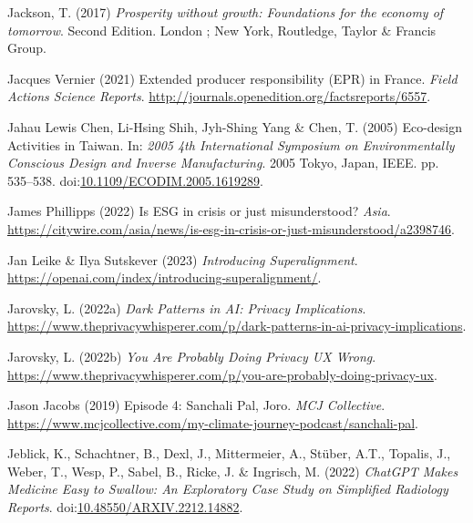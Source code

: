\documentclass[
  letterpaper,
  DIV=11,
  numbers=noendperiod]{scrartcl}
\newlength{\cslhangindent}
\newenvironment{CSLReferences}[2] %
 {\begin{list}{}{%
  \setlength{\itemindent}{0pt}
  \setlength{\leftmargin}{0pt}
  \setlength{\parsep}{0pt}
  \ifodd #1
   \setlength{\leftmargin}{\cslhangindent}
   \setlength{\itemindent}{-1\cslhangindent}
  \fi
  \setlength{\itemsep}{#2\baselineskip}}}
 {\end{list}}
\begin{document}
\begin{CSLReferences}{0}{1}
Jackson, T. (2017) \emph{Prosperity without growth: Foundations for the
economy of tomorrow}. Second Edition. London ; New York, Routledge,
Taylor \& Francis Group.

Jacques Vernier (2021) Extended producer responsibility ({EPR}) in
{France}. \emph{Field Actions Science Reports}.
\url{http://journals.openedition.org/factsreports/6557}.

Jahau Lewis Chen, Li-Hsing Shih, Jyh-Shing Yang \& Chen, T. (2005)
Eco-design {Activities} in {Taiwan}. In: \emph{2005 4th {International
Symposium} on {Environmentally Conscious Design} and {Inverse
Manufacturing}}. 2005 Tokyo, Japan, IEEE. pp. 535--538.
doi:\href{https://doi.org/10.1109/ECODIM.2005.1619289}{10.1109/ECODIM.2005.1619289}.

James Phillipps (2022) Is {ESG} in crisis or just misunderstood?
\emph{Asia}.
\url{https://citywire.com/asia/news/is-esg-in-crisis-or-just-misunderstood/a2398746}.

Jan Leike \& Ilya Sutskever (2023) \emph{Introducing {Superalignment}}.
\url{https://openai.com/index/introducing-superalignment/}.

Jarovsky, L. (2022a) \emph{Dark {Patterns} in {AI}: {Privacy
Implications}}.
\url{https://www.theprivacywhisperer.com/p/dark-patterns-in-ai-privacy-implications}.

Jarovsky, L. (2022b) \emph{You {Are Probably Doing Privacy UX Wrong}}.
\url{https://www.theprivacywhisperer.com/p/you-are-probably-doing-privacy-ux}.

Jason Jacobs (2019) Episode 4: {Sanchali Pal}, {Joro}. \emph{MCJ
Collective}.
\url{https://www.mcjcollective.com/my-climate-journey-podcast/sanchali-pal}.

Jeblick, K., Schachtner, B., Dexl, J., Mittermeier, A., Stüber, A.T.,
Topalis, J., Weber, T., Wesp, P., Sabel, B., Ricke, J. \& Ingrisch, M.
(2022) \emph{{ChatGPT Makes Medicine Easy} to {Swallow}: {An Exploratory
Case Study} on {Simplified Radiology Reports}}.
doi:\href{https://doi.org/10.48550/ARXIV.2212.14882}{10.48550/ARXIV.2212.14882}.


\end{CSLReferences}
\end{document}
